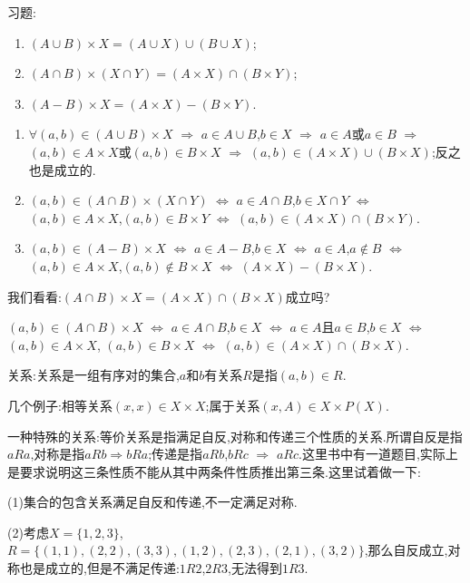 \documentclass[12pt,a4paper,openany]{book}
\begin{document}
习题:
\begin{enumerate}
\item $(A \cup B) \times X = (A \cup X) \cup (B \cup X)$;
\item $(A \cap B) \times (X \cap Y) = (A \times X) \cap (B \times Y)$;
\item $(A-B) \times X = (A \times X) - (B \times Y)$.
\end{enumerate}

\begin{enumerate}
\item $\forall (a,b) \in (A \cup B) \times X$ $\Rightarrow$ $a \in A \cup B$,$b \in X$ $\Rightarrow$ $a \in A$或$a \in B$ $\Rightarrow$ $(a,b) \in A \times X$或$(a,b) \in B \times X$ $\Rightarrow$ $(a,b) \in (A \times X) \cup (B \times X)$;反之也是成立的.
\item $(a,b) \in (A \cap B) \times (X \cap Y)$ $\Leftrightarrow$ $a \in A \cap B$,$b \in X \cap Y$ $\Leftrightarrow$ $(a,b) \in A \times X$,$(a,b) \in B \times Y$ $\Leftrightarrow$ $(a,b) \in (A \times X) \cap (B \times Y)$.
\item $(a,b) \in (A-B) \times X$ $\Leftrightarrow$ $a \in A-B$,$b \in X$ $\Leftrightarrow$ $a \in A$,$a \notin B$ $\Leftrightarrow$ $(a,b) \in A \times X$,$(a,b) \notin B \times X$ $\Leftrightarrow$ $(A \times X)-(B \times X)$.
\end{enumerate}

我们看看:$(A \cap B) \times X = (A \times X) \cap (B \times X)$成立吗?

$(a,b) \in (A \cap B) \times X$ $\Leftrightarrow$ $a \in A \cap B$,$b \in X$ $\Leftrightarrow$ $a \in A$且$a \in B$,$b \in X$ $\Leftrightarrow$ $(a,b) \in A \times X$, $(a,b) \in B \times X$ $\Leftrightarrow$ $(a,b) \in (A \times X) \cap (B \times X)$.

关系:关系是一组有序对的集合,$a$和$b$有关系$R$是指$(a,b) \in R$.

几个例子:相等关系$(x,x) \in X \times X$;属于关系$(x,A) \in X \times P(X)$.

一种特殊的关系:等价关系是指满足自反,对称和传递三个性质的关系.所谓自反是指$aRa$,对称是指$aRb\Rightarrow bRa$;传递是指$aRb$,$bRc$ $\Rightarrow$ $aRc$.这里书中有一道题目,实际上是要求说明这三条性质不能从其中两条件性质推出第三条.这里试着做一下:

(1)集合的包含关系满足自反和传递,不一定满足对称.

(2)考虑$X=\{1,2,3\}$,$R=\{(1,1),(2,2),(3,3),(1,2),(2,3),(2,1),(3,2)\}$,那么自反成立,对称也是成立的,但是不满足传递:$1R2$,$2R3$,无法得到$1R3$.
\end{document}
